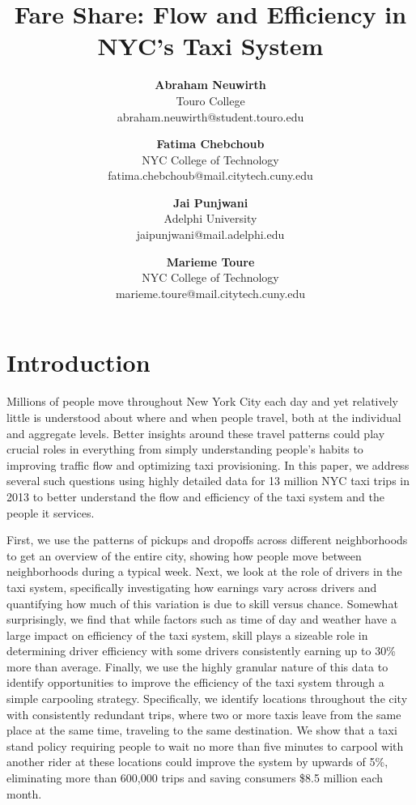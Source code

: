 \documentclass[twocolumn]{article}
\title{\vspace{-0.25in}Fare Share: Flow and Efficiency in NYC's Taxi System}
\author{
\normalsize{\textbf{Abraham Neuwirth}}\\ 
\small Touro College \\ 
\small abraham.neuwirth@student.touro.edu
\and 
\normalsize{\textbf{Fatima Chebchoub}}\\ 
\small NYC College of Technology\\ 
\small fatima.chebchoub@mail.citytech.cuny.edu 
\and 
\normalsize{\textbf{Jai Punjwani}}\\
\small Adelphi University\\
\small jaipunjwani@mail.adelphi.edu 
\and 
\normalsize{\textbf{Marieme Toure}}\\ 
\small NYC College of Technology\\ 
\small marieme.toure@mail.citytech.cuny.edu
}
\date{\vspace{-5ex}}
\begin{document}
\twocolumn[
\begin{@twocolumnfalse}
\maketitle

\end{@twocolumnfalse}
]
\section{Introduction}

Millions of people move throughout New York City each day and yet relatively little is understood about where and when people travel, both at the individual and aggregate levels.
Better insights around these travel patterns could play crucial roles in everything from simply understanding people's habits to improving traffic flow and optimizing taxi provisioning.
In this paper, we address several such questions using highly detailed data for 13 million NYC taxi trips in 2013 to better understand the flow and efficiency of the taxi system and the people it services.

First, we use the patterns of pickups and dropoffs across different neighborhoods to get an overview of the entire city, showing how people move between neighborhoods during a typical week.
Next, we look at the role of drivers in the taxi system, specifically investigating how earnings vary across drivers and quantifying how much of this variation is due to skill versus chance.
Somewhat surprisingly, we find that while factors such as time of day and weather have a large impact on efficiency of the taxi system, skill plays a sizeable role in determining driver efficiency with some drivers consistently earning up to 30\% more than average.
Finally, we use the highly granular nature of this data to identify opportunities to improve the efficiency of the taxi system through a simple carpooling strategy.
Specifically, we identify locations throughout the city with consistently redundant trips, where two or more taxis leave from the same place at the same time, traveling to the same destination.
We show that a taxi stand policy requiring people to wait no more than five minutes to carpool with another rider at these locations could improve the system by upwards of 5\%, eliminating more than 600,000 trips and saving consumers \$8.5 million each month.
\end{document}
